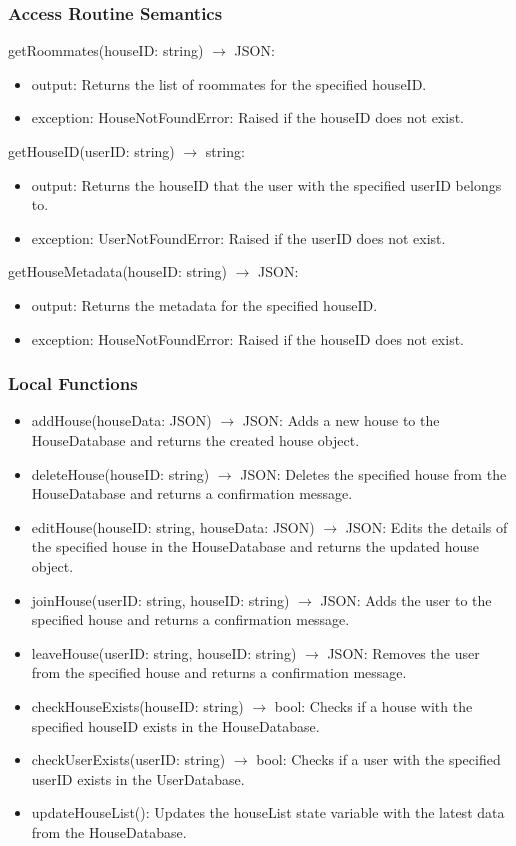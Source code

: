 \documentclass[12pt, titlepage]{article}
\begin{document}
\subsubsection{Access Routine Semantics}

\noindent getRoommates(houseID: string) $\rightarrow$ JSON:
\begin{itemize}
\item output: Returns the list of roommates for the specified houseID.
\item exception: HouseNotFoundError: Raised if the houseID does not exist.
\end{itemize}

\noindent getHouseID(userID: string) $\rightarrow$ string:
\begin{itemize}
\item output: Returns the houseID that the user with the specified userID belongs to.
\item exception: UserNotFoundError: Raised if the userID does not exist.
\end{itemize}

\noindent getHouseMetadata(houseID: string) $\rightarrow$ JSON:
\begin{itemize}
\item output: Returns the metadata for the specified houseID.
\item exception: HouseNotFoundError: Raised if the houseID does not exist.
\end{itemize}

\subsubsection{Local Functions}

\begin{itemize}
  \item addHouse(houseData: JSON) $\rightarrow$ JSON: Adds a new house to the HouseDatabase and returns the created house object.
  \item deleteHouse(houseID: string) $\rightarrow$ JSON: Deletes the specified house from the HouseDatabase and returns a confirmation message.
  \item editHouse(houseID: string, houseData: JSON) $\rightarrow$ JSON: Edits the details of the specified house in the HouseDatabase and returns the updated house object.
  \item joinHouse(userID: string, houseID: string) $\rightarrow$ JSON: Adds the user to the specified house and returns a confirmation message.
  \item leaveHouse(userID: string, houseID: string) $\rightarrow$ JSON: Removes the user from the specified house and returns a confirmation message.
  \item checkHouseExists(houseID: string) $\rightarrow$ bool: Checks if a house with the specified houseID exists in the HouseDatabase.
  \item checkUserExists(userID: string) $\rightarrow$ bool: Checks if a user with the specified userID exists in the UserDatabase.
  \item updateHouseList(): Updates the houseList state variable with the latest data from the HouseDatabase.
\end{itemize}
\end{document}

